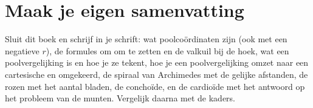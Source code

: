 \begin{oefeningen}






\end{oefeningen}


\ifzelfstudie
\section*{Maak je eigen samenvatting}
Sluit dit boek en schrijf in je schrift: wat poolcoördinaten zijn (ook met een negatieve $r$), de formules om om te zetten en de valkuil bij de hoek, wat een poolvergelijking is en hoe je ze tekent, hoe je een poolvergelijking omzet naar een cartesische en omgekeerd, de spiraal van Archimedes met de gelijke afstanden, de rozen met het aantal bladen, de conchoïde, en de cardioïde met het antwoord op het probleem van de munten. Vergelijk daarna met de kaders.
\fi
